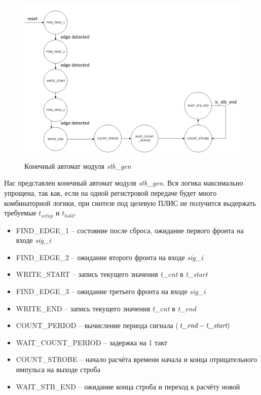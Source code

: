 \lstset{
	numbersep = 5pt,
	stepnumber = 1
}


\begin{figure}[ht!] 
	\center
	\includegraphics [scale=0.7] {my_folder/images//stb_gen_fsm}
	\caption{Конечный автомат модуля \emph{stb\_gen}} 
	\label{fig:stb-gen-fsm}  
\end{figure}

\FloatBarrier

Нас  представлен конечный автомат модуля \emph{stb\_gen}. Вся логика максимально упрощена, так как, если
на одной регистровой передаче будет много комбинаторной логики, при синтезе под целевую ПЛИС не получится выдержать требуемые $ t_{setup} $ и $ t_{hold} $.

\begin{itemize}[label={}]
	\item FIND\_EDGE\_1 -- состояние после сброса, ожидание первого фронта на входе \emph{sig\_i} 
	\item FIND\_EDGE\_2 -- ожидание второго фронта на входе \emph{sig\_i} 
	\item WRITE\_START -- запись текущего значения \emph{t\_cnt} в \emph{t\_start}
	\item FIND\_EDGE\_3 -- ожидание третьего фронта на входе \emph{sig\_i}
	\item WRITE\_END -- запись текущего значения \emph{t\_cnt} в \emph{t\_end}
	\item COUNT\_PERIOD -- вычисление периода сигнала ($ \emph{t\_end} - \emph{t\_start}) $
	\item WAIT\_COUNT\_PERIOD -- задержка на 1 такт
	\item COUNT\_STROBE -- начало расчёта времени начала и конца отрицательного импульса на выходе строба
	\item WAIT\_STB\_END -- ожидание конца строба и переход к расчёту новой\\
\end{itemize}

